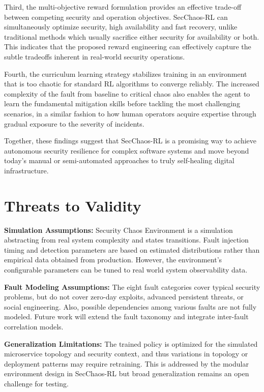\documentclass[pdflatex,sn-mathphys-num]{sn-jnl}%
\theoremstyle{thmstyleone}%
\theoremstyle{thmstyletwo}%
\theoremstyle{thmstylethree}%
\begin{document}
	Third, the multi-objective reward formulation provides an effective trade-off between competing security and operation objectives. SecChaos-RL can simultaneously optimize security, high availability and fast recovery, unlike traditional methods which usually sacrifice either security for availability or both. This indicates that the proposed reward engineering can effectively capture the subtle tradeoffs inherent in real-world security operations.
	
	Fourth, the curriculum learning strategy stabilizes training in an environment that is too chaotic for standard RL algorithms to converge reliably. The increased complexity of the fault from baseline to critical chaos also enables the agent to learn the fundamental mitigation skills before tackling the most challenging scenarios, in a similar fashion to how human operators acquire expertise through gradual exposure to the severity of incidents.
	
	Together, these findings suggest that SecChaos-RL is a promising way to achieve autonomous security resilience for complex software systems and move beyond today's manual or semi-automated approaches to truly self-healing digital infrastructure. 
	
	\section{Threats to Validity}
	
	\textbf{Simulation Assumptions:} Security Chaos Environment is a simulation abstracting from real system complexity and states transitions. Fault injection timing and detection parameters are based on estimated distributions rather than empirical data obtained from production. However, the environment's configurable parameters can be tuned to real world system observability data. 
	
	\textbf{Fault Modeling Assumptions:} The eight fault categories cover typical security problems, but do not cover zero-day exploits, advanced persistent threats, or social engineering. Also, possible dependencies among various faults are not fully modeled. Future work will extend the fault taxonomy and integrate inter-fault correlation models. 
	
	\textbf{Generalization Limitations:} The trained policy is optimized for the simulated microservice topology and security context, and thus variations in topology or deployment patterns may require retraining. This is addressed by the modular environment design in SecChaos-RL but broad generalization remains an open challenge for testing. 
	
\end{document}

